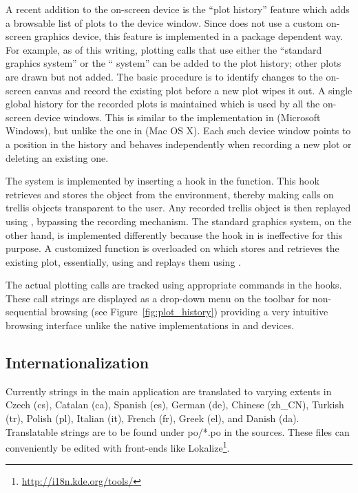 \documentclass[article,shortnames]{jss}
\begin{document}
A recent addition to the on-screen device is the ``plot history'' feature which
adds a browsable list of plots to the device window. Since  does not use a
custom on-screen graphics device, this feature is implemented in a package
dependent way. For example, as of this writing, plotting calls that use either
the ``standard graphics system'' or the `` system'' can be added to the plot
history; other plots are drawn but not added. The basic procedure is to identify
changes to the on-screen canvas and record the existing plot before a new plot
wipes it out. A single global history for the recorded plots is maintained
which is used by all the on-screen device windows. This is similar to the
implementation in  (Microsoft Windows), but unlike the one in  
(Mac OS X). Each such device window points to a position in the history
and behaves independently when recording a new plot or deleting an existing
one.

The  system is implemented by inserting a hook in the 
function. This hook retrieves and stores the  object from the
 environment, thereby making  calls on trellis
objects \citep[see also][]{Sarkar2008} transparent to the user. Any recorded trellis object is then replayed
using , bypassing the recording mechanism. The standard graphics
system, on the other hand, is implemented differently because the hook in
 is ineffective for this purpose. A customized function is overloaded
on  which stores and retrieves the existing plot, essentially, using
 and replays them using .

The actual plotting calls are tracked using appropriate  commands in
the hooks. These call strings are displayed as a drop-down menu on the toolbar
for non-sequential browsing (see Figure~\ref{fig:plot_history}) providing a very intuitive browsing
interface unlike the native implementations in  and  devices.


\subsection{Internationalization}
\label{sec:technical_internationalization}
Currently strings in the main application are translated to varying extents in
Czech (cs), Catalan (ca), Spanish (es), German (de), Chinese (zh\_CN), Turkish
(tr), Polish (pl), Italian (it), French (fr), Greek (el), and Danish (da).
Translatable strings are to be found under po/*.po in the sources. These files
can conveniently be edited with front-ends like Lokalize\footnote{\url{http://i18n.kde.org/tools/}}. 
\end{document}
